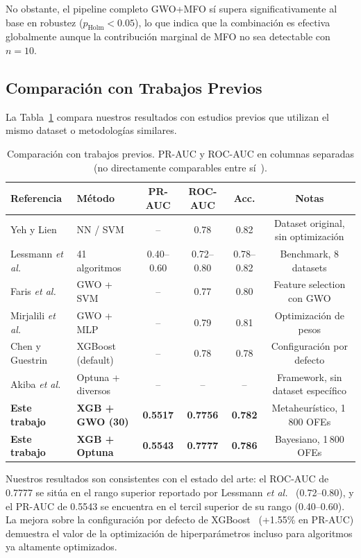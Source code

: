 \documentclass[journal]{IEEEtran}
\begin{document}
No obstante, el pipeline completo GWO+MFO sí supera significativamente al base en robustez ($p_{\text{Holm}} < 0.05$), lo que indica que la combinación es efectiva globalmente aunque la contribución marginal de MFO no sea detectable con $n = 10$.

\subsection{Comparación con Trabajos Previos}
La Tabla~\ref{tab:comparison_lit} compara nuestros resultados con estudios previos que utilizan el mismo dataset o metodologías similares.

\begin{table}[!t]
\caption{Comparación con trabajos previos. PR-AUC y ROC-AUC en columnas separadas (no directamente comparables entre sí~\cite{davis2006}).}
\label{tab:comparison_lit}
\centering
\small
\begin{tabular}{llcccc}
\toprule
Referencia & Método & PR-AUC & ROC-AUC & Acc. & Notas \\
\midrule
Yeh y Lien~\cite{yeh2009} & NN / SVM & -- & 0.78 & 0.82 & Dataset original, sin optimización \\
Lessmann \textit{et al.}~\cite{lessmann2015} & 41 algoritmos & 0.40--0.60 & 0.72--0.80 & 0.78--0.82 & Benchmark, 8 datasets \\
Faris \textit{et al.}~\cite{faris2018} & GWO + SVM & -- & 0.77 & 0.80 & Feature selection con GWO \\
Mirjalili \textit{et al.}~\cite{mirjalili2017} & GWO + MLP & -- & 0.79 & 0.81 & Optimización de pesos \\
Chen y Guestrin~\cite{chen2016} & XGBoost (default) & -- & 0.78 & 0.78 & Configuración por defecto \\
Akiba \textit{et al.}~\cite{akiba2019} & Optuna + diversos & -- & -- & -- & Framework, sin dataset específico \\
\textbf{Este trabajo} & \textbf{XGB + GWO (30)} & \textbf{0.5517} & \textbf{0.7756} & \textbf{0.782} & Metaheurístico, 1\,800 OFEs \\
\textbf{Este trabajo} & \textbf{XGB + Optuna} & \textbf{0.5543} & \textbf{0.7777} & \textbf{0.786} & Bayesiano, 1\,800 OFEs \\
\bottomrule
\end{tabular}
\end{table}

Nuestros resultados son consistentes con el estado del arte: el ROC-AUC de 0.7777 se sitúa en el rango superior reportado por Lessmann \textit{et al.}~\cite{lessmann2015} (0.72--0.80), y el PR-AUC de 0.5543 se encuentra en el tercil superior de su rango (0.40--0.60). La mejora sobre la configuración por defecto de XGBoost~\cite{chen2016} (+1.55\% en PR-AUC) demuestra el valor de la optimización de hiperparámetros incluso para algoritmos ya altamente optimizados.
\end{document}
